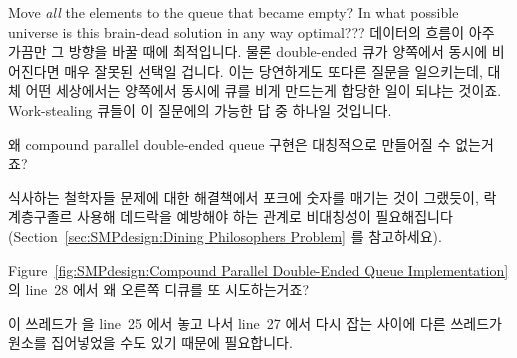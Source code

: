 \begin{enumerate}
	Move \emph{all} the elements to the queue that became empty?
	In what possible universe is this brain-dead solution in any
	way optimal???
	\fi
\QuickA{}
	데이터의 흐름이 아주 가끔만 그 방향을 바꿀 때에 최적입니다.
	물론 double-ended 큐가 양쪽에서 동시에 비어진다면 매우 잘못된 선택일
	겁니다.
	이는 당연하게도 또다른 질문을 일으키는데, 대체 어떤 세상에서는 양쪽에서
	동시에 큐를 비게 만드는게 합당한 일이 되냐는 것이죠.
	Work-stealing 큐들이 이 질문에의 가능한 답 중 하나일 것입니다.

\QuickQ{}
	왜 compound parallel double-ended queue 구현은 대칭적으로 만들어질 수
	없는거죠?

\QuickA{}
	식사하는 철학자들 문제에 대한 해결책에서 포크에 숫자를 매기는 것이
	그랬듯이, 락 계층구졸르 사용해 데드락을 예방해야 하는 관계로 비대칭성이
	필요해집니다 (Section~\ref{sec:SMPdesign:Dining Philosophers Problem}
	를 참고하세요).

\QuickQ{}
	Figure~\ref{fig:SMPdesign:Compound Parallel Double-Ended Queue Implementation}
	의 line~28 에서 왜 오른쪽 디큐를 또 시도하는거죠?

\QuickA{}
	이 쓰레드가  을 line~25 에서 놓고 나서 line~27 에서 다시
	잡는 사이에 다른 쓰레드가 원소를 집어넣었을 수도 있기 때문에
	필요합니다.

\end{enumerate}
